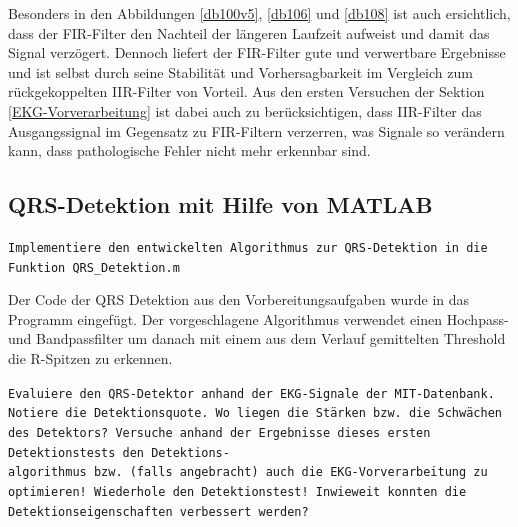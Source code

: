 \documentclass[a4paper,12pt,titlepage]{scrartcl}
\begin{document}
Besonders in den Abbildungen \ref{db100v5}, \ref{db106} und \ref{db108} ist auch ersichtlich, dass der FIR-Filter den Nachteil der längeren Laufzeit aufweist und damit das Signal verzögert. Dennoch liefert der FIR-Filter gute und verwertbare Ergebnisse und ist selbst durch seine Stabilität und Vorhersagbarkeit im Vergleich zum rückgekoppelten IIR-Filter von Vorteil. Aus den ersten Versuchen der Sektion \ref{EKG-Vorverarbeitung} ist dabei auch zu berücksichtigen, dass IIR-Filter das Ausgangssignal im Gegensatz zu FIR-Filtern verzerren, was Signale so verändern kann, dass pathologische Fehler nicht mehr erkennbar sind.


\subsection{QRS-Detektion mit Hilfe von MATLAB}
\texttt{Implementiere den entwickelten Algorithmus zur QRS-Detektion in die Funktion QRS\_Detektion.m}

Der Code der QRS Detektion aus den Vorbereitungsaufgaben wurde in das Programm eingefügt. Der vorgeschlagene Algorithmus verwendet einen Hochpass- und Bandpassfilter um danach mit einem aus dem Verlauf gemittelten Threshold die R-Spitzen zu erkennen.
\vspace{2cm}

\texttt{Evaluiere den QRS-Detektor anhand der EKG-Signale der MIT-Datenbank. Notiere die Detektionsquote. Wo liegen die Stärken bzw. die Schwächen des Detektors? Versuche anhand der Ergebnisse dieses ersten Detektionstests den Detektions-\\algorithmus bzw. (falls angebracht) auch die EKG-Vorverarbeitung zu optimieren! Wiederhole den Detektionstest! Inwieweit konnten die Detektionseigenschaften verbessert werden?}
\end{document}
